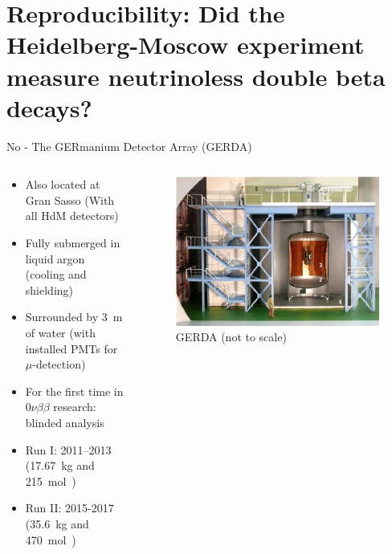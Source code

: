 \section{Reproducibility: Did the Heidelberg-Moscow experiment measure neutrinoless double beta decays?}
\begin{frame}{No - The GERmanium Detector Array (GERDA)}
	\begin{columns}
		\begin{column}{.7\textwidth}
			\begin{itemize}
				\item Also located at Gran Sasso (With all HdM detectors)
				\item Fully submerged in liquid argon (cooling and shielding)
				\item Surrounded by \SI{3}{\meter} of water (with installed PMTs for $\mu$-detection)
				\item For the first time in $0\nu\beta\beta$ research: blinded analysis
				\item Run I: 2011--2013 (\SI{17.67}{\kilo\gram} and \SI{215}{\mole\year}) 
				\item Run II: 2015-2017 (\SI{35.6}{\kilo\gram} and \SI{470}{\mole\year})
			\end{itemize}
		\end{column}
		\begin{column}{.29\textwidth}
			\begin{figure}
				\centering
				\includegraphics[trim=230 0 0 0,clip,width=\textwidth]{media/GERDA.png}
				\caption*{\hspace{-25em}GERDA (not to scale) \footnotemark[1]}
			\end{figure}
		\end{column}
	\end{columns}
\end{frame}
